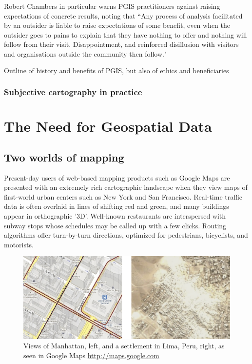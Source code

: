 \documentclass[11pt]{report}
\begin{document}
Robert Chambers in particular warns PGIS practitioners against raising expectations of concrete results, noting that ``Any process of analysis facilitated by an outsider is liable to raise expectations of some benefit, even when the outsider goes to pains to explain that they have nothing to offer and nothing will follow from their visit. Disappointment, and reinforced disillusion with visitors and organisations outside the community then follow."




Outline of history and benefits of PGIS, but also of ethics and beneficiaries

\subsection{Subjective cartography in practice}

\chapter{The Need for Geospatial Data}
\label{chap:need}
\section{Two worlds of mapping}
\label{sec:twoworlds}

Present-day users of web-based mapping products such as Google Maps are presented with an extremely rich cartographic landscape when they view maps of first-world urban centers such as New York and San Francisco. Real-time traffic data is often overlaid in lines of shifting red and green, and many buildings appear in orthographic '3D'. Well-known restaurants are interspersed with subway stops whose schedules may be called up with a few clicks. Routing algorithms offer turn-by-turn directions, optimized for pedestrians, bicyclists, and motorists. 

\begin{figure}[h]
	\begin{center}
		\includegraphics[width=1\textwidth]{images/two-worlds-mapping.png}
		Views of Manhattan, left, and a settlement in Lima, Peru, right, as seen in Google Maps \url{http://maps.google.com}
	\end{center}
\end{figure}
\end{document}
